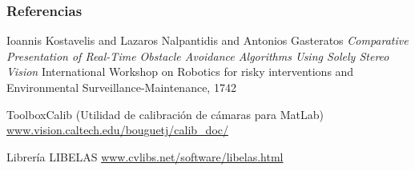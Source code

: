 \documentclass[svgnames]{beamer}
\begin{document}
\begin{frame} 
\frametitle{Referencias} 

\begin{thebibliography}{10} 
\beamertemplatebookbibitems 
{}
Ioannis Kostavelis and Lazaros Nalpantidis and Antonios Gasteratos
\newblock \emph{Comparative Presentation of Real-Time Obstacle Avoidance Algorithms Using Solely Stereo Vision}
 International Workshop on Robotics for risky interventions and Environmental Surveillance-Maintenance, 1742 

ToolboxCalib (Utilidad de calibraci\'on de c\'amaras para MatLab)
\newblock \url{www.vision.caltech.edu/bouguetj/calib_doc/}


Librería LIBELAS
\url{www.cvlibs.net/software/libelas.html}

\end{thebibliography} 

\end{frame} 
\end{document}
